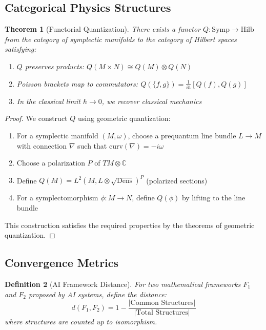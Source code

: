 \documentclass[11pt,a4paper]{article}
\newtheorem{theorem}{Theorem}[section]
\newtheorem{definition}[theorem]{Definition}
\begin{document}
\subsection{Categorical Physics Structures}

\begin{theorem}[Functorial Quantization]
There exists a functor $Q: \text{Symp} \rightarrow \text{Hilb}$ from the category of symplectic manifolds to the category of Hilbert spaces satisfying:
\begin{enumerate}
    \item $Q$ preserves products: $Q(M \times N) \cong Q(M) \otimes Q(N)$
    \item Poisson brackets map to commutators: $Q(\{f, g\}) = \frac{1}{i\hbar}[Q(f), Q(g)]$
    \item In the classical limit $\hbar \rightarrow 0$, we recover classical mechanics
\end{enumerate}
\end{theorem}

\begin{proof}
We construct $Q$ using geometric quantization:
\begin{enumerate}
    \item For a symplectic manifold $(M, \omega)$, choose a prequantum line bundle $L \rightarrow M$ with connection $\nabla$ such that $\text{curv}(\nabla) = -i\omega$
    \item Choose a polarization $P$ of $TM \otimes \mathbb{C}$
    \item Define $Q(M) = L^2(M, L \otimes \sqrt{\text{Dens}})^P$ (polarized sections)
    \item For a symplectomorphism $\phi: M \rightarrow N$, define $Q(\phi)$ by lifting to the line bundle
\end{enumerate}
This construction satisfies the required properties by the theorems of geometric quantization.
\end{proof}

\subsection{Convergence Metrics}

\begin{definition}[AI Framework Distance]
For two mathematical frameworks $F_1$ and $F_2$ proposed by AI systems, define the distance:
\[
d(F_1, F_2) = 1 - \frac{|\text{Common Structures}|}{|\text{Total Structures}|}
\]
where structures are counted up to isomorphism.
\end{definition}
\end{document}
